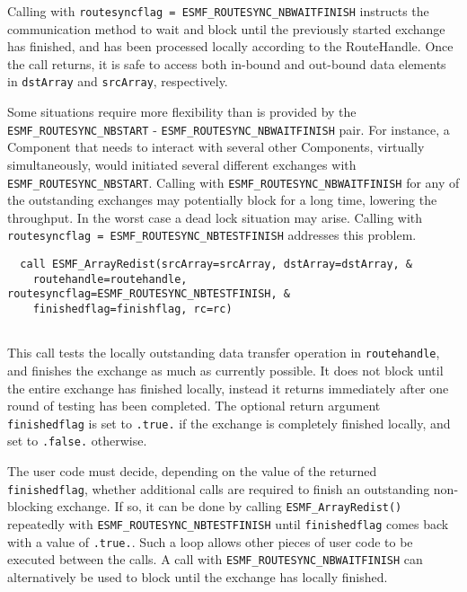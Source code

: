 
   Calling with {\tt routesyncflag = ESMF\_ROUTESYNC\_NBWAITFINISH} instructs the
   communication method to wait and block until the previously started
   exchange has finished, and has been processed locally according to 
   the RouteHandle. Once the call returns, it is safe to access both in-bound
   and out-bound data elements in {\tt dstArray} and {\tt srcArray}, 
   respectively.
  
   \begin{sloppypar}
   Some situations require more flexibility than is provided by the 
   {\tt ESMF\_ROUTESYNC\_NBSTART} - {\tt ESMF\_ROUTESYNC\_NBWAITFINISH} pair. For
   instance, a Component that needs to interact with several other Components,
   virtually simultaneously, would initiated several different exchanges with 
   {\tt ESMF\_ROUTESYNC\_NBSTART}. Calling with {\tt ESMF\_ROUTESYNC\_NBWAITFINISH} for
   any of the outstanding exchanges may potentially block for a long time, 
   lowering the throughput. In the worst case a dead lock situation may arise.
   Calling with {\tt routesyncflag = ESMF\_ROUTESYNC\_NBTESTFINISH} addresses this problem.
   \end{sloppypar} 

 \begin{verbatim}
  call ESMF_ArrayRedist(srcArray=srcArray, dstArray=dstArray, &
    routehandle=routehandle, routesyncflag=ESMF_ROUTESYNC_NBTESTFINISH, &
    finishedflag=finishflag, rc=rc)
 
\end{verbatim}
 

   This call tests the locally outstanding data transfer operation in 
   {\tt routehandle}, and finishes the exchange as much as currently possible.
   It does not block until the entire exchange has finished locally, instead
   it returns immediately after one round of testing has been
   completed. The optional return argument {\tt finishedflag} is set to 
   {\tt .true.} if the exchange is completely finished locally, and set to 
   {\tt .false.} otherwise.
  
   The user code must decide, depending on the value of the returned
   {\tt finishedflag}, whether additional calls are required to finish an
   outstanding non-blocking exchange. If so, it can be done by 
   calling {\tt ESMF\_ArrayRedist()} repeatedly with 
   {\tt ESMF\_ROUTESYNC\_NBTESTFINISH} until 
   {\tt finishedflag} comes back with a value of {\tt .true.}. Such a loop
   allows other pieces of user code to be executed between the calls. 
   A call with {\tt ESMF\_ROUTESYNC\_NBWAITFINISH} can alternatively be used to
   block until the exchange has locally finished.
  
